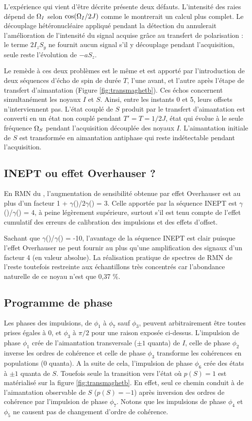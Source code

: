 L'expérience qui vient d'être décrite présente deux défauts. 
L'intensité des raies dépend de $\Omega_I$ selon $\cos(\Omega_I/2J)$
comme le montrerait un calcul plus complet.
Le découplage hétéronucléaire appliqué pendant la détection du {\FID}
annulerait l'amélioration de l'intensité du signal acquise 
grâce au transfert de polarisation : le terme $2I_zS_y$ ne fournit aucun signal 
s'il y découplage pendant l'acquisition, seule reste l'évolution de $-aS_z$.

Le remède à ces deux problèmes est le même et est apporté par l'introduction
de deux séquences d'écho de spin de durée $T$, l'une avant, 
et l'autre après l'étape de transfert d'aimantation (Figure \ref{fig:transmaghetb}).
Ces échos concernent simultanément les noyaux $I$ et $S$.
Ainsi, entre les instants 0 et 5, leurs offsets n'interviennent pas.
L'état couplé de $S$ produit par le transfert d'aimantation
est converti en un état non couplé pendant $T' = T = 1/2J$, état
qui évolue à le seule fréquence $\Omega_S$ pendant l'acquisition
découplée des noyaux $I$.
L'aimantation initiale de $S$ est transformée en aimantation
antiphase qui reste indétectable pendant l'acquisition.

\subsection{INEPT ou effet Overhauser ?}
En RMN du \carb, l'augmentation de sensibilité obtenue par effet Overhauser est au plus
d'un facteur 1 + $\gamma$(\prot)/2$\gamma$(\carb) = 3. 
Celle apportée par la séquence INEPT est $\gamma$(\prot)/$\gamma$(\carb) = 4,
à peine légèrement supérieure, surtout s'il est tenu compte de l'effet
cumulatif des erreurs de calibration des impulsions et des effets d'offset.

Sachant que $\gamma$(\prot)/$\gamma$(\azot) = -10, l'avantage de la séquence INEPT
est clair puisque l'effet Overhauser ne peut fournir au plus qu'une amplification
des signaux d'un facteur 4 (en valeur absolue).
La réalisation pratique de spectres de RMN de l'\azot reste toutefois restreinte
aux échantillons très concentrés car l'abondance naturelle de ce noyau
n'est que 0,37 \%.

\subsection{Programme de phase}
Les phases des impulsions, de $\phi_1$ à $\phi_7$ sauf $\phi_3$,
peuvent arbitrairement être toutes prises égales à $0$, et $\phi_3$ à $\pi/2$
pour une raison exposée ci-dessus.
L'impulsion de phase $\phi_1$ crée de l'aimantation transversale ($\pm 1$ quanta)
de $I$, celle de phase $\phi_2$ inverse les ordres de cohérence et celle de
phase $\phi_3$ transforme les cohérences en populations (0 quanta).
A la suite de cela, l'impulsion de phase $\phi_6$ crée des états à $\pm 1$
quanta de $S$. 
Touefois seule la transition vers l'état où $p(S) = 1$ est matérialisé
sur la figure \ref{fig:transmaghetb}.
En effet, seul ce chemin conduit à de l'aimantation observable de $S$ ($p(S) = -1$)
après inversion des ordres de cohérence par l'impulsion de phase $\phi_7$.
Notons que les impulsions de phase $\phi_4$ et $\phi_5$ ne causent pas
de changement d'ordre de cohérence.

